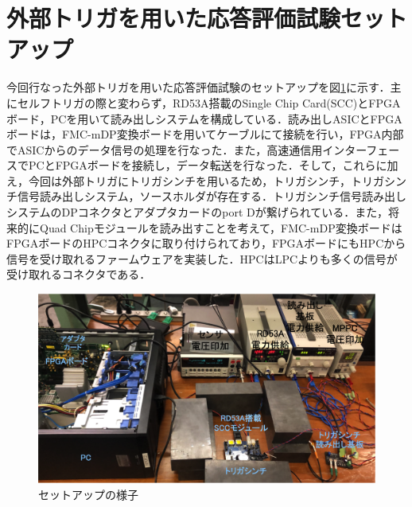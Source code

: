 

\section{外部トリガを用いた応答評価試験セットアップ}
\label{sec:extsetup}
今回行なった外部トリガを用いた応答評価試験のセットアップを図\ref{fig:extsetup}に示す．主にセルフトリガの際と変わらず，RD53A搭載のSingle Chip Card(SCC)とFPGAボード，PCを用いて読み出しシステムを構成している．読み出しASICとFPGAボードは，FMC-mDP変換ボードを用いてケーブルにて接続を行い，FPGA内部でASICからのデータ信号の処理を行なった．また，高速通信用インターフェースでPCとFPGAボードを接続し，データ転送を行なった．そして，これらに加え，今回は外部トリガにトリガシンチを用いるため，トリガシンチ，トリガシンチ信号読み出しシステム，ソースホルダが存在する．トリガシンチ信号読み出しシステムのDPコネクタとアダプタカードのport Dが繋げられている．また，将来的にQuad Chipモジュールを読み出すことを考えて，FMC-mDP変換ボードはFPGAボードのHPCコネクタに取り付けられており，FPGAボードにもHPCから信号を受け取れるファームウェアを実装した．HPCはLPCよりも多くの信号が受け取れるコネクタである．\par

\begin{figure}[h]
  \centering
  \includegraphics[width=15cm]{./figure/extsetup.png}
  \caption{セットアップの様子}
  \label{fig:extsetup}
\end{figure}

